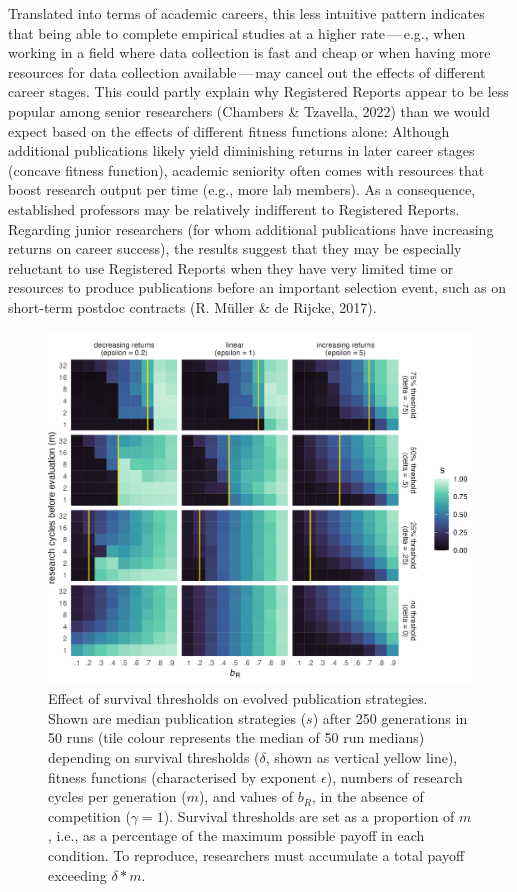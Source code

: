 \documentclass[
  ,man,mask,floatsintext]{apa6}
\begin{document}
Translated into terms of academic careers, this less intuitive pattern indicates that
being able to complete empirical studies at a higher rate\(\,\)---\(\,\)e.g., when working in a field where data collection is fast and cheap or when having more resources for data collection available\(\,\)---\(\,\)may cancel out the effects of different career stages.
This could partly explain why Registered Reports appear to be less popular among senior researchers (Chambers \& Tzavella, 2022) than we would expect based on the effects of different fitness functions alone:
Although additional publications likely yield diminishing returns in later career stages (concave fitness function), academic seniority often comes with resources that boost research output per time (e.g., more lab members).
As a consequence, established professors may be relatively indifferent to Registered Reports.
Regarding junior researchers (for whom additional publications have increasing returns on career success), the results suggest that they may be especially reluctant to use Registered Reports when they have very limited time or resources to produce publications before an important selection event, such as on short-term postdoc contracts (R. Müller \& de Rijcke, 2017).



\begin{figure}
\includegraphics[width=1\linewidth]{../plots/plot_delta_tile_evo} \caption{Effect of survival thresholds on evolved publication strategies. Shown are median publication strategies (\(s\)) after 250 generations in 50 runs (tile colour represents the median of 50 run medians) depending on survival thresholds (\(\delta\), shown as vertical yellow line), fitness functions (characterised by exponent \(\epsilon\)), numbers of research cycles per generation (\(m\)), and values of \(b_{R}\), in the absence of competition (\(\gamma = 1\)). Survival thresholds are set as a proportion of \(m\), i.e., as a percentage of the maximum possible payoff in each condition. To reproduce, researchers must accumulate a total payoff exceeding \(\delta * m\).}\label{fig:deltaplot}
\end{figure}
\end{document}
